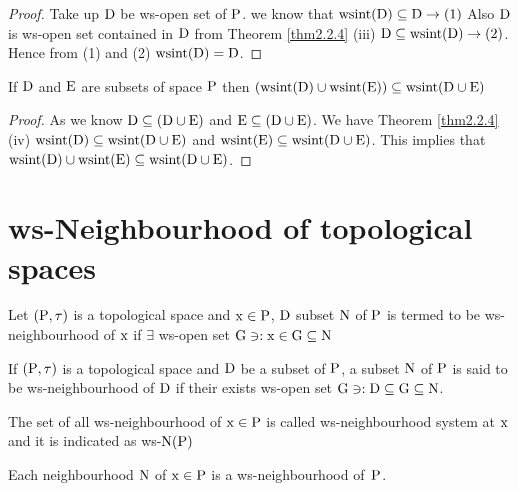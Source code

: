 \begin{proof}
Take up $\mathrm{D}$ be ws-open set of $\mathrm{P}$. we know that $\mathrm{wsint}(\mathrm{D})\subseteq \mathrm{D} \to (1)$ Also $\mathrm{D}$ is ws-open set contained in $\mathrm{D}$ from Theorem \ref{thm2.2.4} (iii) $\mathrm{D}\subseteq \mathrm{wsint}(\mathrm{D})\to (2)$. Hence from (1) and (2) $\mathrm{wsint}(\mathrm{D})=\mathrm{D}$.
\end{proof}

\begin{thm}\label{thm2.4.6}
If $\mathrm{D}$ and $\mathrm{E}$ are subsets of space $\mathrm{P}$ then $(\mathrm{wsint}(\mathrm{D})\cup \mathrm{wsint}(\mathrm{E}))\subseteq \mathrm{wsint}(\mathrm{D}\cup \mathrm{E})$
\end{thm}

\begin{proof}
As we know $\mathrm{D}\subseteq (\mathrm{D}\cup \mathrm{E})$ and $\mathrm{E}\subseteq (\mathrm{D}\cup \mathrm{E})$. We have Theorem \ref{thm2.2.4} (iv) $\mathrm{wsint}(\mathrm{D})\subseteq \mathrm{wsint}(\mathrm{D}\cup \mathrm{E})$ and $\mathrm{wsint}(\mathrm{E})\subseteq \mathrm{wsint}(\mathrm{D}\cup \mathrm{E})$. This implies that $\mathrm{wsint}(\mathrm{D})\cup \mathrm{wsint}(\mathrm{E})\subseteq \mathrm{wsint}(\mathrm{D}\cup \mathrm{E})$.
\end{proof}


\section{ws-Neighbourhood of topological spaces}\label{sec2.5}

\begin{dfn}\label{defi2.5.1}
Let $(\mathrm{P}, \tau)$ is a topological space and $\mathrm{x}\in \mathrm{P}$, $\mathrm{D}$ subset $\mathrm{N}$ of $\mathrm{P}$ is termed to be ws-neighbourhood of $\mathrm{x}$ if $\exists$ ws-open set $\mathrm{G} \ni: \mathrm{x}\in \mathrm{G}\subseteq \mathrm{N}$
\end{dfn}

\begin{dfn}\label{defi2.5.2}
If $(\mathrm{P}, \tau)$ is a topological space and $\mathrm{D}$ be a subset of $\mathrm{P}$, a subset $\mathrm{N}$ of $\mathrm{P}$ is said to be ws-neighbourhood of $\mathrm{D}$ if their exists ws-open set $\mathrm{G} \ni: \mathrm{D}\subseteq \mathrm{G}\subseteq \mathrm{N}$.
\end{dfn}

\begin{dfn}\label{defi2.5.3}
The set of all ws-neighbourhood of $\mathrm{x}\in \mathrm{P}$ is called ws-neighbourhood system at $\mathrm{x}$ and it is indicated as ws-$\mathrm{N}(\mathrm{P})$
\end{dfn}

\begin{thm}\label{thm2.5.1}
Each neighbourhood $\mathrm{N}$ of $\mathrm{x}\in \mathrm{P}$ is a ws-neighbourhood of~$\mathrm{P}$.
\end{thm}

